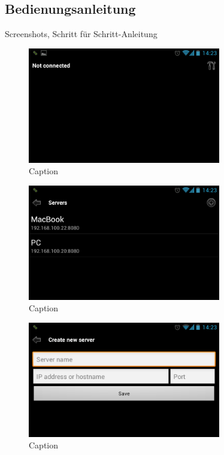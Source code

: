 \documentclass[a4paper,12pt]{article}
\begin{document}
\subsection{Bedienungsanleitung}
Screenshots, Schritt für Schritt-Anleitung

\begin{figure}[H]
\centering
\includegraphics[width=0.75\textwidth]{Screenshot_1.png}
\caption{Caption}
\end{figure}

\begin{figure}[H]
\centering
\includegraphics[width=0.75\textwidth]{Screenshot_2.png}
\caption{Caption}
\end{figure}

\begin{figure}[H]
\centering
\includegraphics[width=0.75\textwidth]{Screenshot_3.png}
\caption{Caption}
\end{figure}
\end{document}
